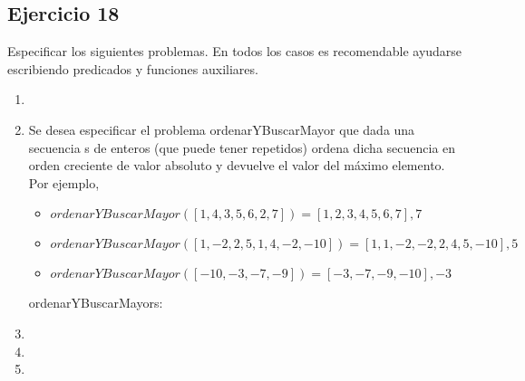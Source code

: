 \subsection{Ejercicio 18}
Especificar los siguientes problemas. En todos los casos es recomendable ayudarse escribiendo predicados y funciones auxiliares.

\begin{enumerate}[label=\alph*)]
      \item \hacer
      \item Se desea especificar el problema ordenarYBuscarMayor que dada una secuencia s de enteros (que puede tener repetidos) ordena dicha secuencia en orden creciente de valor absoluto y devuelve el valor del máximo elemento. Por ejemplo,

            \begin{itemize}
                  \item $ordenarYBuscarMayor([1,4,3,5,6,2,7]) = [1,2,3,4,5,6,7], 7$
                  \item $ordenarYBuscarMayor([1,-2,2,5,1,4,-2,-10]) = [1,1,-2,-2,2,4,5,-10], 5$
                  \item $ordenarYBuscarMayor([-10,-3,-7,-9]) = [-3,-7,-9,-10], -3$
            \end{itemize}

            \begin{proc}{ordenarYBuscarMayor}{\Inout s: \TLista{\ent}}{\ent}



            \end{proc}

      \item \hacer
      \item \hacer
      \item \hacer
\end{enumerate}


